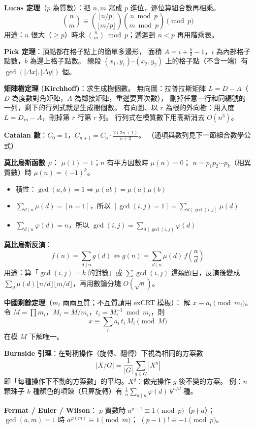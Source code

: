 {\setlength{\parindent}{0pt}
\textbf{Lucas 定理}（$p$ 為質數）：把 $n, m$ 寫成 $p$ 進位，逐位算組合數再相乘。
\[
\binom{n}{m} \equiv \binom{\lfloor n/p\rfloor}{\lfloor m/p\rfloor}\binom{n \bmod p}{m \bmod p} \pmod p
\]
用途：$n$ 很大（$\ge p$）時求 $\binom{n}{m} \bmod p$；遞迴到 $n<p$ 再用階乘表。

\smallskip
\textbf{Pick 定理}：頂點都在格子點上的簡單多邊形，
面積 $A = i + \frac{b}{2} - 1$，$i$ 為內部格子點數，$b$ 為邊上格子點數。
線段 $(x_1,y_1)$--$(x_2,y_2)$ 上的格子點（不含一端）有 $\gcd(|\Delta x|,|\Delta y|)$ 個。

\smallskip
\textbf{矩陣樹定理 (Kirchhoff)}：求生成樹個數。
無向圖：拉普拉斯矩陣 $L = D - A$（$D$ 為度數對角矩陣，$A$ 為鄰接矩陣，重邊要算次數），
刪掉任意一行和同編號的一列，剩下的行列式就是生成樹個數。
有向圖、以 $r$ 為根的外向樹：用入度 $L = D_{in} - A$，刪掉第 $r$ 行第 $r$ 列。
行列式在模質數下用高斯消去 $O(n^3)$。

\smallskip
\textbf{Catalan 數}：$C_0 = 1$，$C_{n+1} = C_n \cdot \frac{2(2n+1)}{n+2}$。
（通項與數列見下一節組合數學公式）

\smallskip
\textbf{莫比烏斯函數 $\mu$}：
$\mu(1)=1$；$n$ 有平方因數時 $\mu(n)=0$；
$n = p_1p_2\cdots p_k$（相異質數）時 $\mu(n)=(-1)^k$。
\begin{itemize}\setlength{\itemsep}{0pt}\setlength{\parskip}{0pt}
\item 積性：$\gcd(a,b)=1 \Rightarrow \mu(ab)=\mu(a)\mu(b)$
\item $\sum_{d\mid n}\mu(d) = [n=1]$，所以 $[\gcd(i,j)=1] = \sum_{d\mid \gcd(i,j)}\mu(d)$
\item $\sum_{d\mid n}\varphi(d) = n$，所以 $\gcd(i,j) = \sum_{d\mid\gcd(i,j)}\varphi(d)$
\end{itemize}

\textbf{莫比烏斯反演}：
\[
f(n) = \sum_{d\mid n} g(d) \iff g(n) = \sum_{d\mid n}\mu(d)\, f\!\left(\frac{n}{d}\right)
\]
用途：算「$\gcd(i,j)=k$ 的對數」或 $\sum\gcd(i,j)$ 這類題目，反演後變成
$\sum_d \mu(d)\lfloor n/d\rfloor\lfloor m/d\rfloor$，再用數論分塊 $O(\sqrt n)$。

\smallskip
\textbf{中國剩餘定理}（$m_i$ 兩兩互質；不互質請用 exCRT 模板）：
解 $x \equiv a_i \pmod{m_i}$。令 $M = \prod m_i$，$M_i = M/m_i$，$t_i = M_i^{-1} \bmod m_i$，則
\[
x \equiv \sum_i a_i\, t_i\, M_i \pmod M
\]
在模 $M$ 下解唯一。

\smallskip
\textbf{Burnside 引理}：在對稱操作（旋轉、翻轉）下視為相同的方案數
\[
|X/G| = \frac{1}{|G|}\sum_{g\in G}|X^g|
\]
即「每種操作下不動的方案數」的平均。$X^g$：做完操作 $g$ 後不變的方案。
例：$n$ 顆珠子 $k$ 種顏色的項鍊（只算旋轉）有 $\frac{1}{n}\sum_{d\mid n}\varphi(d)\,k^{n/d}$ 種。

\smallskip
\textbf{Fermat / Euler / Wilson}：
$p$ 質數時 $a^{p-1}\equiv 1 \pmod p$（$p\nmid a$）；
$\gcd(a,m)=1$ 時 $a^{\varphi(m)} \equiv 1 \pmod m$；
$(p-1)! \equiv -1 \pmod p$。
\par}
